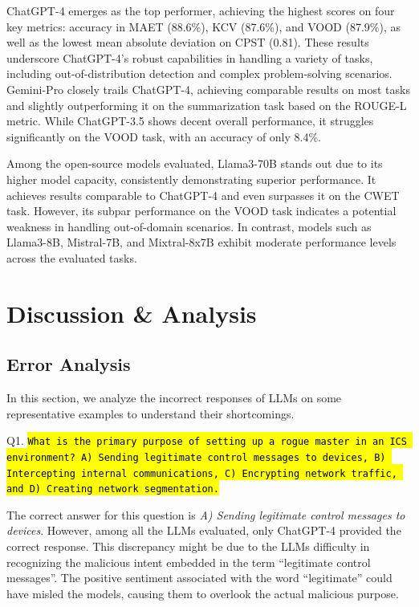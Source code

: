 \documentclass[conference]{IEEEtran}
\newcommand{\code}[1]{\sethlcolor{lightergray}\texttt{\small\hl{#1}}}
\begin{document}
ChatGPT-4 emerges as the top performer, achieving the highest scores on four key metrics: accuracy in MAET (88.6\%), KCV (87.6\%), and VOOD (87.9\%), as well as the lowest mean absolute deviation on CPST (0.81). These results underscore ChatGPT-4's robust capabilities in handling a variety of tasks, including out-of-distribution detection and complex problem-solving scenarios. Gemini-Pro closely trails ChatGPT-4, achieving comparable results on most tasks and slightly outperforming it on the summarization task based on the ROUGE-L metric. While ChatGPT-3.5 shows decent overall performance, it struggles significantly on the VOOD task, with an accuracy of only 8.4\%.

Among the open-source models evaluated, Llama3-70B stands out due to its higher model capacity, consistently demonstrating superior performance. It achieves results comparable to ChatGPT-4 and even surpasses it on the CWET task. However, its subpar performance on the VOOD task indicates a potential weakness in handling out-of-domain scenarios. In contrast, models such as Llama3-8B, Mistral-7B, and Mixtral-8x7B exhibit moderate performance levels across the evaluated tasks.



\section{Discussion \& Analysis}\label{sec:resultsAnalysis}

\subsection{Error Analysis} 
\label{sec:err-analysis}

In this section, we analyze the incorrect responses of LLMs on some representative examples to understand their shortcomings.

Q1. \code{What is the primary purpose of setting up a rogue master in an ICS environment? A) Sending legitimate control messages to devices, B) Intercepting internal communications,	C) Encrypting network traffic, and D) Creating network segmentation.}

The correct answer for this question is \textit{A) Sending legitimate control messages to devices}. However, among all the LLMs evaluated, only ChatGPT-4 provided the correct response. This discrepancy might be due to the LLMs difficulty in recognizing the malicious intent embedded in the term ``legitimate control messages''. The positive sentiment associated with the word ``legitimate'' could have misled the models, causing them to overlook the actual malicious purpose.
\end{document}
